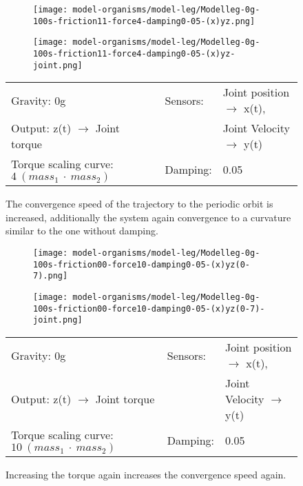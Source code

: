 \documentclass[main]{subfiles}
\begin{document}
\begin{figure}[H]
	\centering
		\begin{subfigure}[c]{0.45\textwidth}
	\texttt{[image: model-organisms/model-leg/Modelleg-0g-100s-friction11-force4-damping0-05-(x)yz.png]}
		\end{subfigure}
	\begin{subfigure}[c]{0.45\textwidth}
	\texttt{[image: model-organisms/model-leg/Modelleg-0g-100s-friction11-force4-damping0-05-(x)yz-joint.png]}
		\end{subfigure}
	\caption[Damped, torque increased, limited chaotic controller controlling model leg]{The convergence speed of the trajectory to the periodic orbit is increased, additionally the system again convergence to a curvature similar to the one without damping.}
	\begin{tabular}{l|ll}
	\hline 
	Gravity: 0g  & Sensors: & Joint position \(\rightarrow\) x(t),\\
	 Output: z(t) \(\rightarrow\) Joint torque &  & Joint Velocity \(\rightarrow\) y(t) \\
	  Torque scaling curve: \(4~(mass_1~\cdot~mass_2)\) & Damping: & 0.05 \\
	  \hline
	\end{tabular}

	\label{figure:limited-damped-model-leg-damping2}
\end{figure}

\begin{figure}[H]
	\centering
		\begin{subfigure}[c]{0.45\textwidth}
	\texttt{[image: model-organisms/model-leg/Modelleg-0g-100s-friction00-force10-damping0-05-(x)yz(0-7).png]}
		\end{subfigure}
	\begin{subfigure}[c]{0.45\textwidth}
	\texttt{[image: model-organisms/model-leg/Modelleg-0g-100s-friction00-force10-damping0-05-(x)yz(0-7)-joint.png]}
		\end{subfigure}
	\caption[Damped, torque increased, limited chaotic controller controlling model leg]{Increasing the torque again increases the convergence speed again.}
	\begin{tabular}{l|ll}
	\hline 
	Gravity: 0g  & Sensors: & Joint position \(\rightarrow\) x(t),\\
	 Output: z(t) \(\rightarrow\) Joint torque &  & Joint Velocity \(\rightarrow\) y(t) \\
	  Torque scaling curve: \(10~(mass_1~\cdot~mass_2)\) & Damping: & 0.05 \\
	  \hline
	\end{tabular}

	\label{figure:limited-damped-model-leg6-damping3}
\end{figure}
\end{document}
